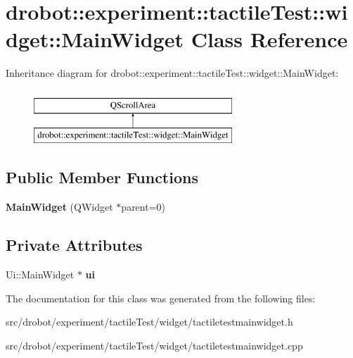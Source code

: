 \hypertarget{classdrobot_1_1experiment_1_1tactileTest_1_1widget_1_1MainWidget}{\section{drobot\-:\-:experiment\-:\-:tactile\-Test\-:\-:widget\-:\-:Main\-Widget Class Reference}
\label{classdrobot_1_1experiment_1_1tactileTest_1_1widget_1_1MainWidget}
}
Inheritance diagram for drobot\-:\-:experiment\-:\-:tactile\-Test\-:\-:widget\-:\-:Main\-Widget\-:\begin{figure}[H]
\begin{center}
\leavevmode
\includegraphics[height=2.000000cm]{classdrobot_1_1experiment_1_1tactileTest_1_1widget_1_1MainWidget}
\end{center}
\end{figure}
\subsection*{Public Member Functions}
\begin{DoxyCompactItemize}
\item 
\hypertarget{classdrobot_1_1experiment_1_1tactileTest_1_1widget_1_1MainWidget_a65b43165ab8b3ce3b6a38f62f27a1c8b}{{\bfseries Main\-Widget} (Q\-Widget $\ast$parent=0)}\label{classdrobot_1_1experiment_1_1tactileTest_1_1widget_1_1MainWidget_a65b43165ab8b3ce3b6a38f62f27a1c8b}

\end{DoxyCompactItemize}
\subsection*{Private Attributes}
\begin{DoxyCompactItemize}
\item 
\hypertarget{classdrobot_1_1experiment_1_1tactileTest_1_1widget_1_1MainWidget_a2a6ebbf269a8bae0f9a5aef294d3d7c6}{Ui\-::\-Main\-Widget $\ast$ {\bfseries ui}}\label{classdrobot_1_1experiment_1_1tactileTest_1_1widget_1_1MainWidget_a2a6ebbf269a8bae0f9a5aef294d3d7c6}

\end{DoxyCompactItemize}


The documentation for this class was generated from the following files\-:\begin{DoxyCompactItemize}
\item 
src/drobot/experiment/tactile\-Test/widget/tactiletestmainwidget.\-h\item 
src/drobot/experiment/tactile\-Test/widget/tactiletestmainwidget.\-cpp\end{DoxyCompactItemize}
